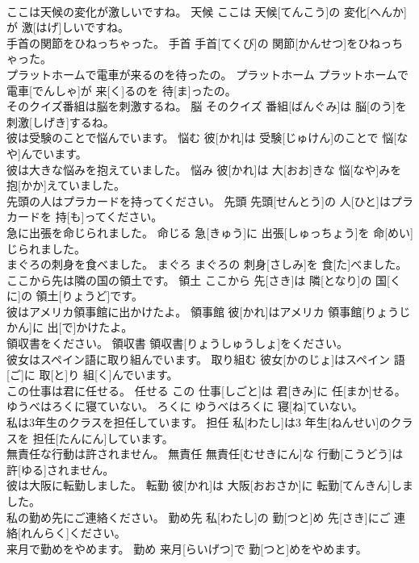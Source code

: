 \documentclass[8pt]{extreport}
\begin{document}
\begin{CJK}{UTF8}{min}
\\	ここは天候の変化が激しいですね。	天候	ここは 天候[てんこう]の 変化[へんか]が 激[はげ]しいですね。	
\\	手首の関節をひねっちゃった。	手首	手首[てくび]の 関節[かんせつ]をひねっちゃった。	
\\	プラットホームで電車が来るのを待ったの。	プラットホーム	プラットホームで 電車[でんしゃ]が 来[く]るのを 待[ま]ったの。	
\\	そのクイズ番組は脳を刺激するね。	脳	そのクイズ 番組[ばんぐみ]は 脳[のう]を 刺激[しげき]するね。	
\\	彼は受験のことで悩んでいます。	悩む	彼[かれ]は 受験[じゅけん]のことで 悩[なや]んでいます。	
\\	彼は大きな悩みを抱えていました。	悩み	彼[かれ]は 大[おお]きな 悩[なや]みを 抱[かか]えていました。	
\\	先頭の人はプラカードを持ってください。	先頭	先頭[せんとう]の 人[ひと]はプラカードを 持[も]ってください。	
\\	急に出張を命じられました。	命じる	急[きゅう]に 出張[しゅっちょう]を 命[めい]じられました。	
\\	まぐろの刺身を食べました。	まぐろ	まぐろの 刺身[さしみ]を 食[た]べました。	
\\	ここから先は隣の国の領土です。	領土	ここから 先[さき]は 隣[となり]の 国[くに]の 領土[りょうど]です。	
\\	彼はアメリカ領事館に出かけたよ。	領事館	彼[かれ]はアメリカ 領事館[りょうじかん]に 出[で]かけたよ。	
\\	領収書をください。	領収書	領収書[りょうしゅうしょ]をください。	
\\	彼女はスペイン語に取り組んでいます。	取り組む	彼女[かのじょ]はスペイン 語[ご]に 取[と]り 組[く]んでいます。	
\\	この仕事は君に任せる。	任せる	この 仕事[しごと]は 君[きみ]に 任[まか]せる。	
\\	ゆうべはろくに寝ていない。	ろくに	ゆうべはろくに 寝[ね]ていない。	
\\	私は3年生のクラスを担任しています。	担任	私[わたし]は3 年生[ねんせい]のクラスを 担任[たんにん]しています。	
\\	無責任な行動は許されません。	無責任	無責任[むせきにん]な 行動[こうどう]は 許[ゆる]されません。	
\\	彼は大阪に転勤しました。	転勤	彼[かれ]は 大阪[おおさか]に 転勤[てんきん]しました。	
\\	私の勤め先にご連絡ください。	勤め先	私[わたし]の 勤[つと]め 先[さき]にご 連絡[れんらく]ください。	
\\	来月で勤めをやめます。	勤め	来月[らいげつ]で 勤[つと]めをやめます。	

\end{CJK}
\end{document}
